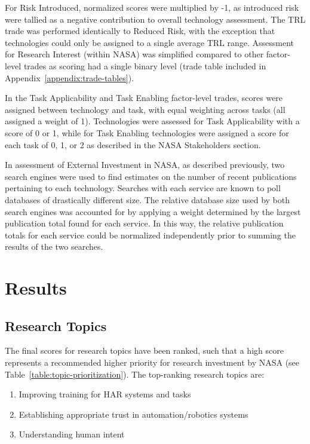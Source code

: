 For Risk Introduced, normalized scores were multiplied by -1, as introduced risk were tallied as a negative contribution to overall technology assessment.
The TRL trade was performed identically to Reduced Risk, with the exception that technologies could only be assigned to a single average TRL range.
Assessment for Research Interest (within NASA) was simplified compared to other factor-level trades as scoring had a single binary level (trade table included in Appendix~\ref{appendix:trade-tables}).

In the Task Applicability and Task Enabling factor-level trades, scores were assigned between technology and task, with equal weighting across tasks (all assigned a weight of 1).
Technologies were assessed for Task Applicability with a score of 0 or 1, while for Task Enabling technologies were assigned a score for each task of 0, 1, or 2 as described in the NASA Stakeholders section.

In assessment of External Investment in NASA, as described previously, two search engines were used to find estimates on the number of recent publications pertaining to each technology.
Searches with each service are known to poll databases of drastically different size.
The relative database size used by both search engines was accounted for by applying a weight determined by the largest publication total found for each service.
In this way, the relative publication totals for each service could be normalized independently prior to summing the results of the two searches.

\section{Results}

\subsection{Research Topics}
The final scores for research topics have been ranked, such that a high score represents a recommended higher priority for research investment by NASA (see Table~\ref{table:topic-prioritization}).
The top-ranking research topics are:
\begin{enumerate}
    \item Improving training for HAR systems and tasks
    \item Establishing appropriate trust in automation/robotics systems
    \item Understanding human intent
\end{enumerate}

